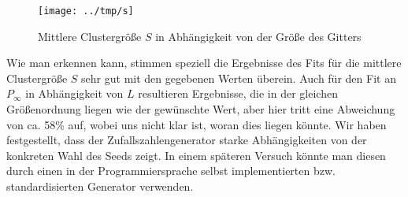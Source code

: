 \begin{figure}[htb]
  \centering
  \texttt{[image: ../tmp/s]}
  \caption{Mittlere Clustergröße $S$ in Abhängigkeit von der Größe des Gitters}
  \label{fig:S}
\end{figure}


Wie man erkennen kann, stimmen speziell die Ergebnisse des Fits für die mittlere Clustergröße $S$
sehr gut mit den gegebenen Werten überein. Auch für den Fit an $P_{\infty}$ in Abhängigkeit von
$L$ resultieren Ergebnisse, die in der gleichen Größenordnung liegen wie der gewünschte Wert, aber hier
tritt eine Abweichung von ca. 58\% auf, wobei uns nicht klar ist, woran dies liegen könnte. Wir haben
festgestellt, dass der Zufallszahlengenerator starke Abhängigkeiten von der konkreten Wahl des Seeds
zeigt. In einem späteren Versuch könnte man diesen durch einen in der Programmiersprache selbst implementierten
bzw. standardisierten Generator verwenden.